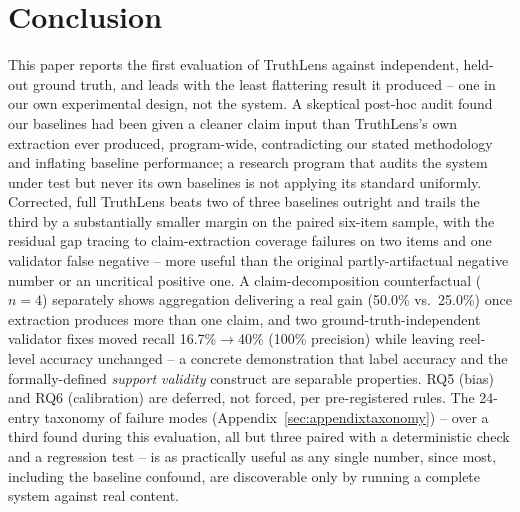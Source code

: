 \documentclass[conference]{IEEEtran}
\begin{document}
\section{Conclusion}
\label{sec:conclusion}

This paper reports the first evaluation of TruthLens against independent,
held-out ground truth, and leads with the least flattering result it
produced -- one in our own experimental design, not the system. A
skeptical post-hoc audit found our baselines had been given a cleaner
claim input than TruthLens's own extraction ever produced, program-wide,
contradicting our stated methodology and inflating baseline performance;
a research program that audits the system under test but never its own
baselines is not applying its standard uniformly. Corrected, full
TruthLens beats two of three baselines outright and trails the third by a
substantially smaller margin on the paired six-item sample, with the
residual gap tracing to claim-extraction coverage failures on two items
and one validator false negative -- more useful than the original
partly-artifactual negative number or an uncritical positive one. A
claim-decomposition counterfactual ($n=4$) separately shows aggregation
delivering a real gain (50.0\% vs.\ 25.0\%) once extraction produces more
than one claim, and two ground-truth-independent validator fixes moved
recall 16.7\%$\to$40\% (100\% precision) while leaving reel-level accuracy
unchanged -- a concrete demonstration that label accuracy and the
formally-defined \emph{support validity} construct are separable
properties. RQ5 (bias) and RQ6 (calibration) are deferred, not forced,
per pre-registered rules. The 24-entry taxonomy of failure modes
(Appendix~\ref{sec:appendixtaxonomy}) -- over a third found during this
evaluation, all but three paired with a deterministic check and a
regression test -- is as practically useful as any single number, since
most, including the baseline confound, are discoverable only by running a
complete system against real content.
\end{document}
